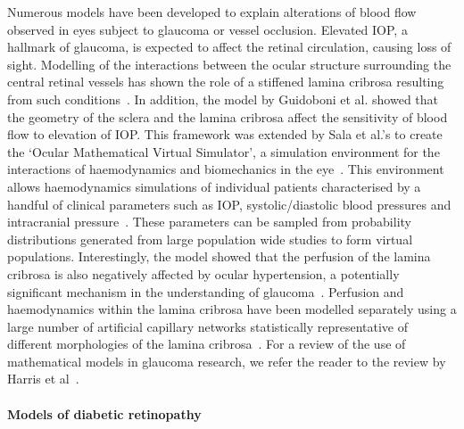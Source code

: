 \documentclass{article}
\begin{document}
Numerous models have been developed to explain alterations of blood flow observed in eyes subject to glaucoma or vessel occlusion\cite{Chuangsuwanich_2016,Guidoboni_2014,Sala_2018,Sala_2020}.
Elevated IOP, a hallmark of glaucoma, is expected to affect the retinal circulation, causing loss of sight.
Modelling of the interactions between the ocular structure surrounding the central retinal vessels has shown the role of a stiffened lamina cribrosa resulting from such conditions~\cite{Guidoboni_2014}.
In addition, the model by Guidoboni et al. showed that the geometry of the sclera and the lamina cribrosa affect the sensitivity of blood flow to elevation of IOP.
This framework was extended by Sala et al.'s to create the `Ocular Mathematical Virtual Simulator', a simulation environment for the interactions of haemodynamics and biomechanics in the eye~\cite{Sala_2018,Sala_2018a,Sala_2020}.
This environment allows haemodynamics simulations of individual patients characterised by a handful of clinical parameters such as IOP, systolic/diastolic blood pressures and intracranial pressure~\cite{Sala_2020}.
These parameters can be sampled from probability distributions generated from large population wide studies to form virtual populations.
Interestingly, the model showed that the perfusion of the lamina cribrosa is also negatively affected by ocular hypertension, a potentially significant mechanism in the understanding of glaucoma~\cite{Sala_2020}.
Perfusion and haemodynamics within the lamina cribrosa have been modelled separately using a large number of artificial capillary networks statistically representative of different morphologies of the lamina cribrosa~\cite{Chuangsuwanich_2016}.
For a review of the use of mathematical models in glaucoma research, we refer the reader to the review by Harris et al~\cite{Harris_2013}.

\paragraph*{Models of diabetic retinopathy}
\end{document}

